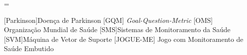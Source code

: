 \documentclass[a4paper,titlepage]{copin}
\begin{document}
\pagestyle{fancy}
\addtolength{\headwidth}{\marginparsep}\addtolength{\headwidth}{\marginparwidth}\headwidth = \textwidth
\renewcommand{\chaptermark}[1]{\markboth{#1}{}}
\renewcommand{\sectionmark}[1]{\markright{\thesection\ #1}}\lhead[\fancyplain{}{\bfseries\thepage}]%
	     {\fancyplain{}{\emph{\rightmark}}}\rhead[\fancyplain{}{\bfseries\leftmark}]%
             {\fancyplain{}{\bfseries\thepage}}\cfoot{}


\Sumario
\ListadeSimbolos
\begin{acronym}
	[Parkinson]{Doença de Parkinson}
	 [GQM] {\textit{Goal-Question-Metric}}
	 [OMS] {Organização Mundial de Saúde}	
	 [SMS]{Sistemas de Monitoramento da Saúde}
	 [SVM]{Máquina de Vetor de Suporte}
	 [JOGUE-ME] {Jogo com Monitoramento de Saúde Embutido}
\end{acronym}


\listoffigures
\listoftables
\lstlistoflistings %

\newpage
\cleardoublepage

\Introducao


%
%




	






%
%


%
%
\textsc{}
%

%




\appendix




\end{document}
